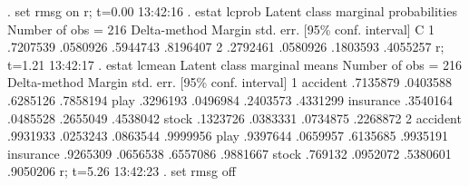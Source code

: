 . set rmsg on
r; t=0.00 13:42:16
{\smallskip}
. estat lcprob
{\smallskip}
Latent class marginal probabilities                        Number of obs = 216
{\smallskip}
             {\VBAR}            Delta-method
             {\VBAR}     Margin   std. err.     [95\% conf. interval]
           C {\VBAR}
          1  {\VBAR}   .7207539   .0580926      .5944743    .8196407
          2  {\VBAR}   .2792461   .0580926      .1803593    .4055257
r; t=1.21 13:42:17
{\smallskip}
. estat lcmean
{\smallskip}
Latent class marginal means                                Number of obs = 216
{\smallskip}
             {\VBAR}            Delta-method
             {\VBAR}     Margin   std. err.     [95\% conf. interval]
1            {\VBAR}
    accident {\VBAR}   .7135879   .0403588      .6285126    .7858194
        play {\VBAR}   .3296193   .0496984      .2403573    .4331299
   insurance {\VBAR}   .3540164   .0485528      .2655049    .4538042
       stock {\VBAR}   .1323726   .0383331      .0734875    .2268872
2            {\VBAR}
    accident {\VBAR}   .9931933   .0253243      .0863544    .9999956
        play {\VBAR}   .9397644   .0659957      .6135685    .9935191
   insurance {\VBAR}   .9265309   .0656538      .6557086    .9881667
       stock {\VBAR}    .769132   .0952072      .5380601    .9050206
r; t=5.26 13:42:23
{\smallskip}
. set rmsg off
{\smallskip}
